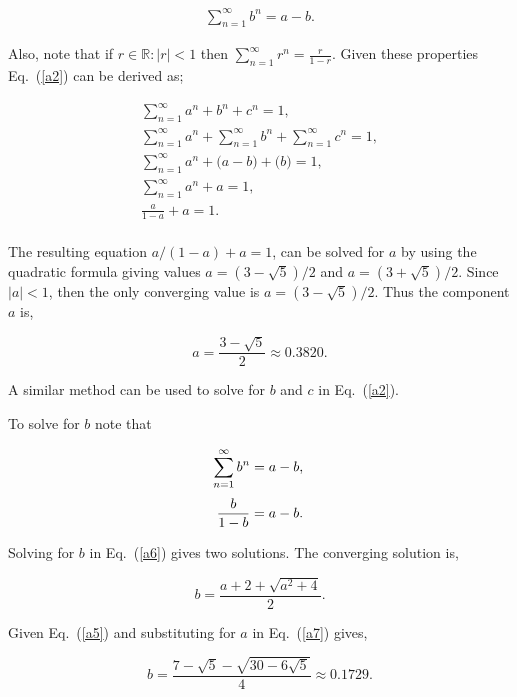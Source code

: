 \documentclass{ws-fnl2}
\begin{document}
\begin{align*}
\sum^\infty_{n=1}b^n = a - b.
\end{align*}



\noindent
Also, note that if $r \in \mathbb{R} : |r|<1 $ then $\sum^\infty_{n=1}r^n = \frac{r}{1-r}$. Given these properties Eq.~(\ref{a2}) can be derived as;

\begin{align*}
 \sum^\infty_{n=1}a^n+b^n+c^n =1, \\
 \sum^\infty_{n=1}a^n+\sum^\infty_{n=1}b^n+\sum^\infty_{n=1}c^n =1, \\
 \sum^\infty_{n=1}a^n+\big(a-b\big)+\big(b\big)=1, \\
 \sum^\infty_{n=1}a^n+a=1, \\
 \frac{a}{1-a}+a=1. \\
\end{align*}


\noindent
The resulting equation $a/(1-a)+a =1$, can be solved for $a$ by using the quadratic formula giving values $a=(3-\sqrt{5})/2$ and $a=(3+\sqrt{5})/2$. Since $|a|<1$, then the only converging value is $a=(3-\sqrt{5})/2$. Thus the component $a$ is,

\begin{equation}
a=\frac{3-\sqrt{5}}{2} \approx 0.3820. 
\label{a5}
\end{equation}

\noindent
A similar method can be used to solve for $b$ and $c$ in Eq.~(\ref{a2}). 

To solve for $b$ note that 

\begin{equation*}
 \sum^\infty_{n=1}b^n =a-b, \\
\end{equation*}
\begin{equation}
 \frac{b}{1-b}=a-b. \\
 \label{a6}
\end{equation}

\noindent
Solving for $b$ in Eq.~(\ref{a6}) gives two solutions. The converging solution is,

\begin{equation}
 b=\frac{a+2+\sqrt{a^2+4}}{2}.
 \label{a7}
\end{equation}

\noindent
Given Eq.~(\ref{a5}) and substituting for $a$ in Eq.~(\ref{a7}) gives,

\begin{equation}
 b=\frac{7-\sqrt{5}-\sqrt{30-6\sqrt{5}}}{4} \approx 0.1729.
 \label{a8}
\end{equation}
\end{document}
